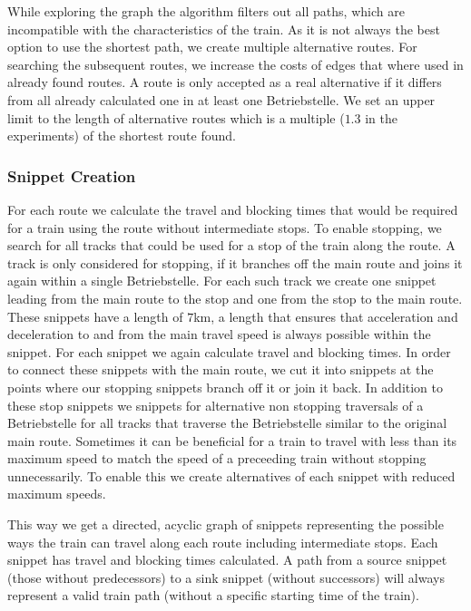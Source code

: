 While exploring the graph the algorithm filters out all paths, which are incompatible with the characteristics of the train.
As it is not always the best option to use the shortest path, we create multiple alternative routes. For searching the subsequent routes, we increase the costs of edges that where used in already found routes. A route is only accepted as a real alternative if it differs from all already calculated one in at least one Betriebstelle. We set an upper limit to the length of alternative routes which is a multiple ($1.3$ in the experiments) of the shortest route found.


\subsubsection{Snippet Creation}

For each route we calculate the travel and blocking times that would be required for a train using the route without intermediate stops. To enable stopping, we search for all tracks that could be used for a stop of the train along the route. A track is only considered for stopping, if it branches off the main route and joins it again within a single Betriebstelle. For each such track we create one snippet leading from the main route to the stop and one from the stop to the main route. These snippets have a length of $7$km, a length that ensures that acceleration and deceleration to and from the main travel speed is always possible within the snippet. For each snippet we again calculate travel and blocking times. In order to connect these snippets with the main route, we cut it into snippets at the points where our stopping snippets branch off it or join it back. In addition to these stop snippets we snippets for alternative non stopping traversals of a Betriebstelle for all tracks that traverse the Betriebstelle similar to the original main route. Sometimes it can be beneficial for a train to travel with less than its maximum speed to match the speed of a preceeding train without stopping unnecessarily. To enable this we create alternatives of each snippet with reduced maximum speeds.

This way we get a directed, acyclic graph of snippets representing the possible ways the train can travel along each route including intermediate stops. Each snippet has travel and blocking times calculated. A path from a source snippet (those without predecessors) to a sink snippet (without successors) will always represent a valid train path (without a specific starting time of the train).


